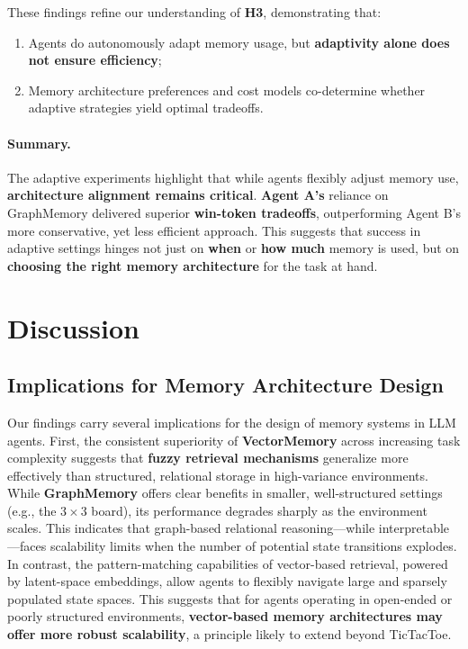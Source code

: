 \documentclass[10pt]{article}
\begin{document}
These findings refine our understanding of \textbf{H3}, demonstrating that:
\begin{enumerate}[leftmargin=*,nosep]
\item Agents do autonomously adapt memory usage, but \textbf{adaptivity alone does not ensure efficiency};
\item Memory architecture preferences and cost models co-determine whether adaptive strategies yield optimal tradeoffs.
\end{enumerate}

\paragraph{Summary.}
The adaptive experiments highlight that while agents flexibly adjust memory use, \textbf{architecture alignment remains critical}. \textbf{Agent A's} reliance on GraphMemory delivered superior \textbf{win-token tradeoffs}, outperforming Agent B's more conservative, yet less efficient approach. This suggests that success in adaptive settings hinges not just on \textbf{when} or \textbf{how much} memory is used, but on \textbf{choosing the right memory architecture} for the task at hand.

\section{Discussion}

\subsection{Implications for Memory Architecture Design}

Our findings carry several implications for the design of memory systems in LLM agents. First, the consistent superiority of \textbf{VectorMemory} across increasing task complexity suggests that \textbf{fuzzy retrieval mechanisms} generalize more effectively than structured, relational storage in high-variance environments. While \textbf{GraphMemory} offers clear benefits in smaller, well-structured settings (e.g., the $3 \times 3$ board), its performance degrades sharply as the environment scales. This indicates that graph-based relational reasoning—while interpretable—faces scalability limits when the number of potential state transitions explodes. In contrast, the pattern-matching capabilities of vector-based retrieval, powered by latent-space embeddings, allow agents to flexibly navigate large and sparsely populated state spaces. This suggests that for agents operating in open-ended or poorly structured environments, \textbf{vector-based memory architectures may offer more robust scalability}, a principle likely to extend beyond TicTacToe.
\end{document}
